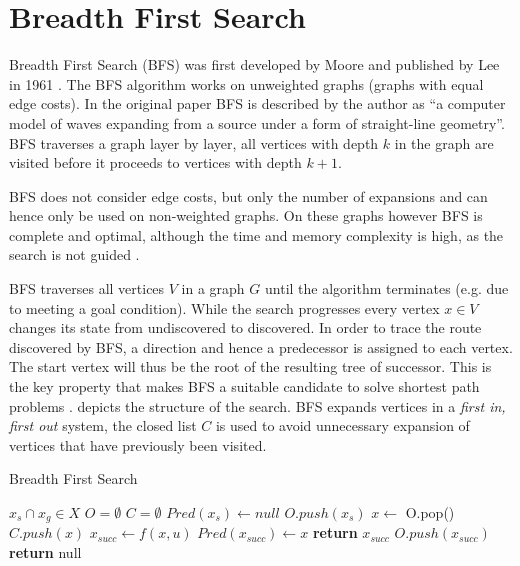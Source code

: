 \section{Breadth First Search}
Breadth First Search (BFS) was first developed by Moore and published by Lee in 1961 \cite{Lee.1961}. The BFS algorithm works on unweighted graphs (graphs with equal edge costs). In the original paper BFS is described by the author as ``a computer model of waves expanding from a source under a form of straight-line geometry''. BFS traverses a graph layer by layer, all vertices with depth $k$ in the graph are visited before it proceeds to vertices with depth $k+1$.

BFS does not consider edge costs, but only the number of expansions and can hence only be used on non-weighted graphs. On these graphs however BFS is complete and optimal, although the time and memory complexity is high, as the search is not guided \cite{Lee.1961,LaValle.2006} .

BFS traverses all vertices $V$ in a graph $G$ until the algorithm terminates (e.g. due to meeting a goal condition). While the search progresses every vertex $x \in V$ changes its state from undiscovered to discovered. In order to trace the route discovered by BFS, a direction and hence a predecessor is assigned to each vertex. The start vertex will thus be the root of the resulting tree of successor. This is the key property that makes BFS a suitable candidate to solve shortest path problems \cite{Skiena.2008}.  depicts the structure of the search. BFS expands vertices in a \textit{first in, first out} system, the closed list $C$ is used to avoid unnecessary expansion of vertices that have previously been visited.

\begin{algorithm}
    \caption{Breadth First Search}\label{alg:BFS}
    \begin{algorithmic}[1]
        \Require $x_s \cap x_g \in X$
        \State $O = \emptyset$
        \State $C = \emptyset$
        \State $Pred(x_s) \gets null$
        \State $O.push(x_s)$
            \State $x \gets$ O.pop()
            \State $C.push(x)$
                    \State $x_{succ} \gets f(x,u)$
                            \State $Pred(x_{succ}) \gets x$
                                \State \textbf{return} $x_{succ}$
                            \EndIf
                            \State $O.push(x_{succ})$
                        \EndIf
                    \EndIf
                \EndFor
        \EndWhile
        \State \textbf{return} null
    \end{algorithmic}
\end{algorithm}

